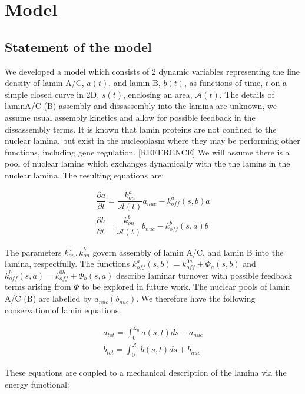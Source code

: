 \section{Model}

\subsection{Statement of the model} We developed a model which consists of 2 dynamic variables representing the line density of lamin A/C, $a(t)$, and lamin B, $b(t)$, as functions of time, $t$ on a simple closed curve in 2D, $s(t)$, enclosing an area, $\mathcal{A}(t)$. The details of laminA/C (B)  assembly and dissassembly into the lamina are unknown, we assume usual assembly kinetics and allow for possible feedback in the dissassembly terms. It is known that lamin proteins are not confined to the nuclear lamina, but exist in the nucleoplasm where they may be performing other functions, including gene regulation. [REFERENCE] We will assume there is a pool of nuclear lamins which exchanges dynamically with the the lamins in the nuclear lamina. The resulting equations are:

\begin{align}
\dfrac{\partial a}{\partial t} = \dfrac{k_{on}^a}{\mathcal{A}(t)} a_{nuc} - k_{off}^a (s,b)a\\[7pt]
\dfrac{\partial b}{\partial t} = \dfrac{k_{on}^b}{\mathcal{A}(t)}b_{nuc} - k_{off}^b  (s,a)b \label{eq::laminaKinetics}
\end{align}

The parameters $k_{on}^a , k_{on}^b$  govern assembly of lamin A/C, and lamin B into the lamina, respectfully. The functions $k_{off}^a (s,b) = k_{off}^{0a} + \Phi_a(s,b)$ and $ k_{off}^b(s,a)  = k_{off}^{0b} + \Phi_b(s,a)$ describe laminar turnover with possible feedback terms arising from $\Phi$ to be explored in future work. The nuclear pools of lamin A/C (B) are labelled by $a_{nuc} (b_{nuc})$. We therefore have the following conservation of lamin equations. 

\begin{align}
a_{tot}= \int_0^{\mathcal{L}_0} a(s,t) ds + a_{nuc}\\
b_{tot} = \int_0^{\mathcal{L}_0} b(s,t) ds + b_{nuc}
\end{align}

These equations are coupled to a mechanical description of the lamina via the energy functional:

